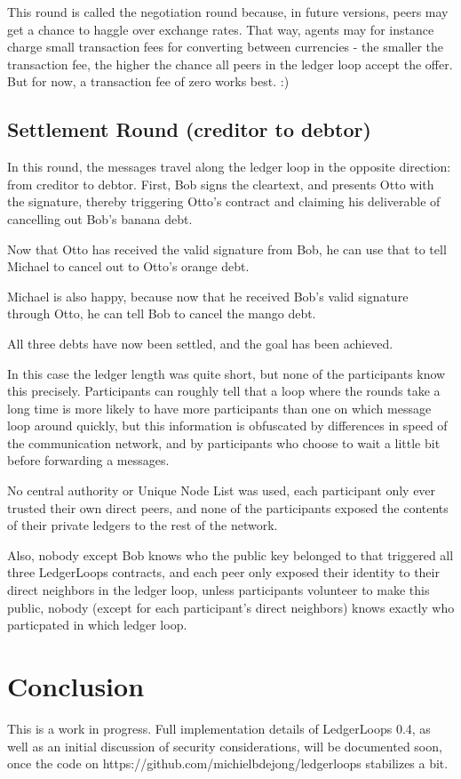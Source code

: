 \documentclass[11pt,twoside,a4paper]{article}
\begin{document}
This round is called the negotiation round because, in future versions, peers may get a chance to haggle over exchange rates. That
way, agents may for instance charge small transaction fees for converting between currencies - the smaller the transaction fee,
the higher the chance all peers in the ledger loop accept the offer. But for now, a transaction fee of zero works best. :)

\subsection{Settlement Round (creditor to debtor)}

In this round, the messages travel along the ledger loop in the opposite direction: from creditor to debtor. First, Bob signs the
cleartext, and presents Otto with the signature, thereby triggering Otto's contract and claiming his deliverable of cancelling out
Bob's banana debt.

Now that Otto has received the valid signature from Bob, he can use that to tell Michael to cancel out to Otto's orange debt.

Michael is also happy, because now that he received Bob's valid signature through Otto, he can tell Bob to cancel the mango debt.

All three debts have now been settled, and the goal has been achieved.

In this case the ledger length was quite short, but none of the participants know this precisely. Participants can roughly tell that
a loop where the rounds take a long time is more likely to have more participants than one on which message loop around quickly,
but this information is obfuscated by differences in speed of the communication network, and by participants who choose to wait a
little bit before forwarding a messages.

No central authority or Unique Node List was used, each participant only ever trusted their own direct peers, and none of the participants
exposed the contents of their private ledgers to the rest of the network.

Also, nobody except Bob knows who the public key belonged to that triggered all three LedgerLoops contracts, and each peer only exposed
their identity to their direct neighbors in the ledger loop, unless participants volunteer to make this public,
nobody (except for each participant's direct neighbors) knows exactly who particpated in which ledger loop.

\section{Conclusion}
This is a work in progress. Full implementation details of LedgerLoops 0.4, as well as an initial discussion of security considerations,
will be documented soon, once the code on
https://github.com/michielbdejong/ledgerloops stabilizes a bit.
\end{document}
